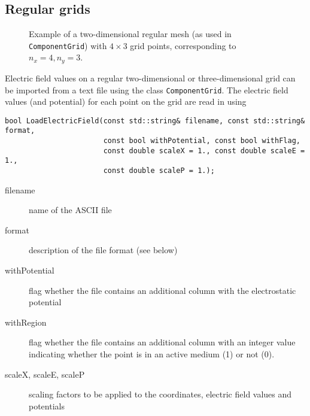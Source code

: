 \subsection{Regular grids}
\begin{figure}
  \centering
  \caption{Example of a two-dimensional regular mesh (as used in 
           \texttt{ComponentGrid}) with $4\times3$ grid points, 
           corresponding to $n_{x} = 4, n_{y} = 3$.} 
  \label{Fig:MeshComponentGrid}
\end{figure}
Electric field values on a regular two-dimensional or three-dimensional grid 
can be imported from a text file using the class \texttt{ComponentGrid}. 
The electric field values (and potential) for each point on the grid 
are read in using
\begin{lstlisting}
bool LoadElectricField(const std::string& filename, const std::string& format,
                       const bool withPotential, const bool withFlag,
                       const double scaleX = 1., const double scaleE = 1.,
                       const double scaleP = 1.);
\end{lstlisting}
\begin{description}
  \item[filename]
  name of the ASCII file
  \item[format]
  description of the file format (see below)
  \item[withPotential]
  flag whether the file contains an additional column with the electrostatic potential
  \item[withRegion]
  flag whether the file contains an additional column with an integer value 
  indicating whether the point is in an active medium (1) or not (0).
  \item[scaleX, scaleE, scaleP]
  scaling factors to be applied to the coordinates, electric field values 
  and potentials 
\end{description}
